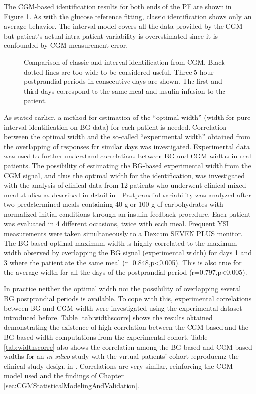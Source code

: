 The CGM-based identification results for both ends of the PF are shown in Figure \ref{fig:classicvsintervalCGM}. As with the glucose reference fitting, classic identification shows only an average behavior. The interval model covers all the data provided by the CGM but patient's actual intra-patient variability is overestimated since it is confounded by CGM measurement error. 
\begin{figure}[hbt]
\centering
{}\caption{Comparison of classic and interval identification from CGM. Black dotted lines are too wide to be considered useful. Three 5-hour postprandial periods in consecutive days are shown. The first and third days correspond to the same meal and insulin infusion to the patient.}
\label{fig:classicvsintervalCGM}
\end{figure}
As stated earlier, a method for estimation of the ``optimal width'' (width for pure interval identification on BG data) for each patient is needed. Correlation between the optimal width and the so-called ``experimental width'' obtained from the overlapping of responses for similar days was investigated. Experimental data was used to further understand correlations between BG and CGM widths in real patients. The possibility of estimating the BG-based experimental width from the CGM signal, and thus the optimal width for the identification, was investigated with the analysis of clinical data from 12 patients who underwent clinical mixed meal studies as described in detail in \cite{paoloibolus2012}. Postprandial variability was analyzed after two predetermined meals containing 40 g or 100 g of carbohydrates with normalized initial conditions through an insulin feedback procedure. Each patient was evaluated in 4 different occasions, twice with each meal. Frequent YSI measurements were taken simultaneously to a Dexcom\textsuperscript{\textregistered} SEVEN\textsuperscript{\textregistered} PLUS monitor. The BG-based optimal maximum width is highly correlated to the maximum width observed by overlapping the BG signal (experimental width) for days 1 and 3 where the patient ate the same meal (r=0.848,p<0.005). This is also true for the average width for all the days of the postprandial period (r=0.797,p<0.005).

In practice neither the optimal width nor the possibility of overlapping several BG postprandial periods is available. To cope with this, experimental correlations between BG and CGM width were investigated using the experimental dataset introduced before. Table \ref{tab:widthscorre} shows the results obtained demonstrating the existence of high correlation between the CGM-based and the BG-based width computations from the experimental cohort. Table \ref{tab:widthscorre} also shows the correlation among the BG-based and CGM-based widths for an \textit{in silico} study with the virtual patients' cohort reproducing the clinical study design in \cite{paoloibolus2012}. Correlations are very similar, reinforcing the CGM model used and the findings of Chapter \ref{sec:CGMStatisticalModelingAndValidation}.

